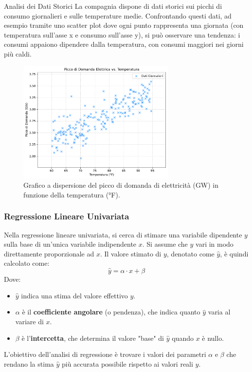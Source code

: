 \documentclass{article}
\begin{document}
\begin{notebox}{Analisi dei Dati Storici}
    La compagnia dispone di dati storici sui picchi di consumo giornalieri e sulle temperature medie. Confrontando questi dati, ad esempio tramite uno scatter plot dove ogni punto rappresenta una giornata (con temperatura sull'asse x e consumo sull'asse y), si può osservare una tendenza: i consumi appaiono dipendere dalla temperatura, con consumi maggiori nei giorni più caldi.
\end{notebox}

\begin{figure}[H]
    \centering
    \includegraphics[width=0.7\textwidth]{images/electricity_consumption_scatter.pdf}
    \caption{Grafico a dispersione del picco di domanda di elettricità (GW) in funzione della temperatura (°F).}
    \label{fig:electricity_scatter}
\end{figure}


\subsubsection{Regressione Lineare Univariata}
Nella regressione lineare univariata, si cerca di stimare una variabile dipendente $y$ sulla base di un'unica variabile indipendente $x$. Si assume che $y$ vari in modo direttamente proporzionale ad $x$. Il valore stimato di $y$, denotato come $\hat{y}$, è quindi calcolato come:
$$ \hat{y} = \alpha \cdot x + \beta $$
Dove:
\begin{itemize}
    \item $\hat{y}$ indica una stima del valore effettivo $y$.
    \item $\alpha$ è il \textbf{coefficiente angolare} (o pendenza), che indica quanto $\hat{y}$ varia al variare di $x$.
    \item $\beta$ è l'\textbf{intercetta}, che determina il valore "base" di $\hat{y}$ quando $x$ è nullo.
\end{itemize}
L'obiettivo dell'analisi di regressione è trovare i valori dei parametri $\alpha$ e $\beta$ che rendano la stima $\hat{y}$ più accurata possibile rispetto ai valori reali $y$.
\end{document}
